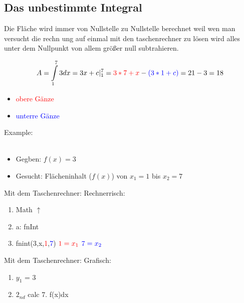 \newpage
\subsection{Das unbestimmte Integral}

Die Fläche wird immer von Nullstelle zu Nullstelle berechnet weil wen man versucht die rechn ung auf einmal
mit den taschenrechner zu lösen wird alles unter dem Nullpunkt von allem größer null subtrahieren.


$$A=\int\limits_1^7 3dx=3x+c |_1^7 = \textcolor{red}{3*7+x}-\textcolor{blue}{(3*1+c)} = 21-3 = 18$$
\begin{itemize}
    \item \textcolor{red}{obere Gänze}
    \item \textcolor{blue}{unterre Gänze}
\end{itemize}


\hfill \break
Example:\\
\fboxrule=0.8pt \\

\hfill \break
\begin{itemize}
    \item Gegben: $f(x)=3$
    \item Gesucht: Flächeninhalt ($f(x)$) von $x_1=1$ bis $x_2=7$
\end{itemize}


\hfill \break
Mit dem Taschenrechner: Rechnerrisch:
\begin{enumerate}
    \item Math $\uparrow$
    \item a: fnInt
    \item fnint(3,x,\textcolor{red}{1},\textcolor{blue}{7}) $\textcolor{red}{1=x_1}$ $\textcolor{blue}{7=x_2}$
\end{enumerate}

\hfill \break
Mit dem Taschenrechner: Grafisch:
\begin{enumerate}
    \item $y_1$ = 3
    \item $2_{nd}$ calc 7. f(x)dx
\end{enumerate}

